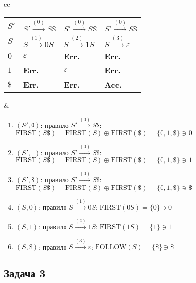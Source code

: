 \documentclass[a4paper]{article}
\def\first{\mathrm{ FIRST} }
\def\follow{\mathrm{ FOLLOW} }
\begin{document}
\begin{enumerate}
\begin{tabular}{cc}
\begin{minipage}{0.29\textwidth}
\begin{tabular}{|l|l|l|l|}
$S'$ & $S'\overset{(0)}{\to}S\$$ & $S'\overset{(0)}{\to}S\$$ & $S'\overset{(0)}{\to}S\$$ \\\hline
$S$ & $S\overset{(1)}{\to}0S$ & $S\overset{(2)}{\to}1S$ & $S\overset{(3)}{\to}\varepsilon$ \\\hline
$0$ & $\varepsilon$ & {\bf Err.} & {\bf Err.}\\\hline
$1$ & {\bf Err.} & $\varepsilon$ & {\bf Err.}\\\hline
$\$$ & {\bf Err.} & {\bf Err.} & {\bf Acc.} \\\hline
\end{tabular}
\end{minipage} &
\begin{minipage}{0.7\textwidth}
\begin{enumerate}
\item $(S',0)$: правило $S'\overset{(0)}{\to}S\$$: $\first(S\$)=\first(S)\oplus\first(\$)=\{0,1,\$\}\ni 0$
\item $(S',1)$: правило $S'\overset{(0)}{\to}S\$$: $\first(S\$)=\first(S)\oplus\first(\$)=\{0,1,\$\}\ni 1$
\item $(S',\$)$: правило $S'\overset{(0)}{\to}S\$$: $\first(S\$)=\first(S)\oplus\first(\$)=\{0,1,\$\}\ni \$$
\item $(S,0)$: правило $S\overset{(1)}{\to}0S$: $\first(0S)=\{0\}\ni 0$
\item $(S,1)$: правило $S\overset{(2)}{\to}1S$: $\first(1S)=\{1\}\ni 1$
\item $(S,\$)$: правило $S\overset{(3)}{\to}\varepsilon$: $\follow(S)=\{\$\}\ni \$$
\end{enumerate}
\end{minipage}
\end{tabular}
\end{enumerate}
\subsection*{Задача 3}
\end{document}
